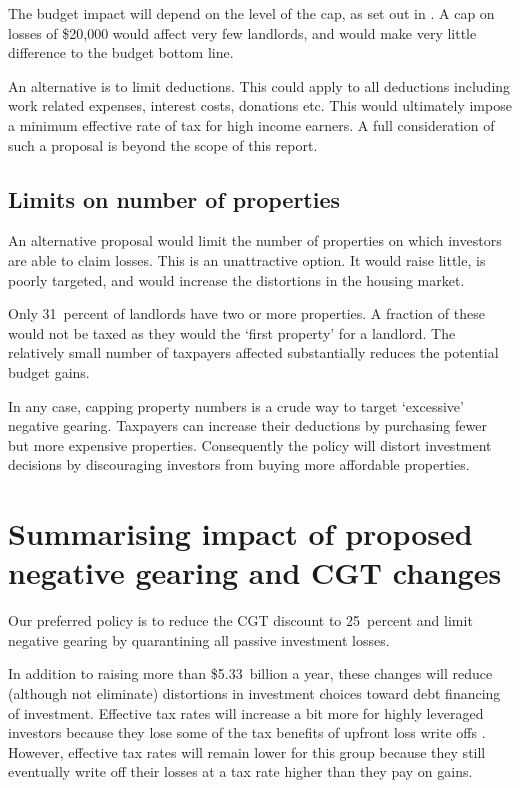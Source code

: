 \documentclass{grattan}\usepackage[]{graphicx}\usepackage[]{color}
\begin{document}
The budget impact will depend on the level of the cap, as set out in . A cap on losses of \$20,000  would affect very few landlords, and would make very little difference to the budget bottom line.

An alternative is to limit deductions. This could apply to all deductions including work related expenses, interest costs, donations etc. This would ultimately impose a minimum effective rate of tax for high income earners.   A full consideration of such a proposal is beyond the scope of this report. 

\subsection{Limits on number of properties}
An alternative proposal would limit the number of properties on which investors are able to claim losses.  This is an unattractive option. It would raise little, is poorly targeted, and would increase the distortions in the housing market.



Only 31~percent of landlords have two or more properties.  A fraction of these would not be taxed as they would the `first property' for a landlord. The relatively small number of taxpayers affected substantially reduces the potential budget gains. 

In any case, capping property numbers is a crude way to target `excessive' negative gearing. Taxpayers can increase their deductions by purchasing fewer but more expensive properties. Consequently the policy will distort investment decisions by discouraging investors from buying more affordable properties. 

\section{Summarising impact of proposed negative gearing and CGT changes}
Our preferred policy is to reduce the CGT discount to 25~percent and limit negative gearing by quarantining all passive investment losses. 

In addition to raising more than \$5.33~billion a year, these changes will reduce (although not eliminate) distortions in investment choices toward debt financing of investment. Effective tax rates will increase a bit more for highly leveraged investors because they lose some of the tax benefits of upfront loss write offs . However, effective tax rates will remain lower for this group because they still eventually write off their losses at a tax rate higher than they pay on gains. 
\end{document}
